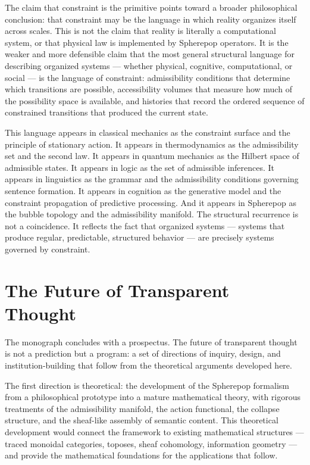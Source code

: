 \documentclass[12pt,openany]{book}
\theoremstyle{plain}
\theoremstyle{definition}
\theoremstyle{remark}
\begin{document}
The claim that constraint is the primitive points toward a broader philosophical conclusion: that constraint may be the language in which reality organizes itself across scales. This is not the claim that reality is literally a computational system, or that physical law is implemented by Spherepop operators. It is the weaker and more defensible claim that the most general structural language for describing organized systems — whether physical, cognitive, computational, or social — is the language of constraint: admissibility conditions that determine which transitions are possible, accessibility volumes that measure how much of the possibility space is available, and histories that record the ordered sequence of constrained transitions that produced the current state.

This language appears in classical mechanics as the constraint surface and the principle of stationary action. It appears in thermodynamics as the admissibility set and the second law. It appears in quantum mechanics as the Hilbert space of admissible states. It appears in logic as the set of admissible inferences. It appears in linguistics as the grammar and the admissibility conditions governing sentence formation. It appears in cognition as the generative model and the constraint propagation of predictive processing. And it appears in Spherepop as the bubble topology and the admissibility manifold. The structural recurrence is not a coincidence. It reflects the fact that organized systems — systems that produce regular, predictable, structured behavior — are precisely systems governed by constraint.

\section*{The Future of Transparent Thought}

The monograph concludes with a prospectus. The future of transparent thought is not a prediction but a program: a set of directions of inquiry, design, and institution-building that follow from the theoretical arguments developed here.

The first direction is theoretical: the development of the Spherepop formalism from a philosophical prototype into a mature mathematical theory, with rigorous treatments of the admissibility manifold, the action functional, the collapse structure, and the sheaf-like assembly of semantic content. This theoretical development would connect the framework to existing mathematical structures — traced monoidal categories, toposes, sheaf cohomology, information geometry — and provide the mathematical foundations for the applications that follow.
\end{document}
